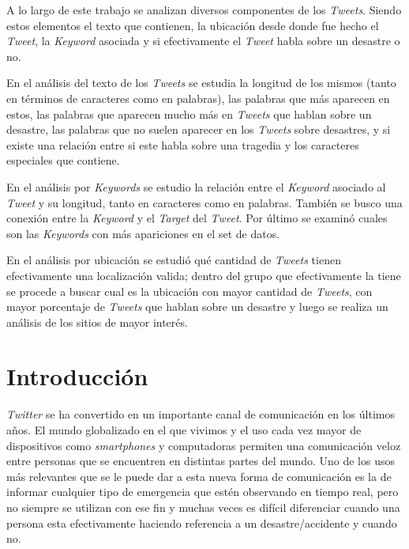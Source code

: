 \documentclass[titlepage,a4paper]{article}
\begin{document}
A lo largo de este trabajo se analizan diversos componentes de los \textit{Tweets}. Siendo estos elementos el texto que contienen, la ubicación desde donde fue hecho el \textit{Tweet}, la \textit{Keyword} asociada y si efectivamente el \textit{Tweet} habla sobre un desastre o no.

En el análisis del texto de los \textit{Tweets} se estudia la longitud de los mismos (tanto en términos de caracteres como en palabras), las palabras que más aparecen en estos, las palabras que aparecen mucho más en \textit{Tweets} que hablan sobre un desastre, las palabras que no suelen aparecer en los \textit{Tweets} sobre desastres, y si existe una relación entre si este habla sobre una tragedia y los caracteres especiales que contiene.

En el análisis por \textit{Keywords} se estudio la relación entre el \textit{Keyword} asociado al \textit{Tweet} y su longitud, tanto en caracteres como en palabras. También se busco una conexión entre la \textit{Keyword} y el \textit{Target} del \textit{Tweet}. Por último se examinó cuales son las \textit{Keywords} con más apariciones en el set de datos.

En el análisis por ubicación se estudió qué cantidad de \textit{Tweets} tienen efectivamente una localización valida; dentro del grupo que efectivamente la tiene se procede a buscar cual es la ubicación con mayor cantidad de \textit{Tweets}, con mayor porcentaje de \textit{Tweets} que hablan sobre un desastre y luego se realiza un análisis de los sitios de mayor interés.




\newpage

\section{Introducción}\label{sec:intro}

    \textit{Twitter} se ha convertido en un importante canal de comunicación en los últimos años. El mundo globalizado en el que vivimos y el uso cada vez mayor de dispositivos como  \textit{smartphones} y computadoras permiten una comunicación veloz entre personas que se encuentren en distintas partes del mundo. Uno de los usos más relevantes que se le puede dar a esta nueva forma de comunicación es la de informar cualquier tipo de emergencia que estén observando en tiempo real, pero no siempre se utilizan con ese fin y muchas veces es difícil diferenciar cuando una persona esta efectivamente haciendo referencia a un desastre/accidente y cuando no.
\end{document}
